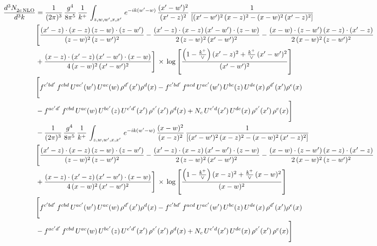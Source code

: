 \documentclass[10pt]{article}
\numberwithin{equation}{section}
\begin{document}
\begin{align}
    \frac{d^{3}N_{2c\,\rm NLO}^{\rm}}{d^{3}k}  & =  \frac{1}{(2\pi)^{3}}\, \frac{g^{4}}{8\pi^{5}}\,\frac{1}{k^{+}}\,\int_{z,w,w^{\prime},x,x'}\, e^{-ik(w^{\prime}-w)}\,\frac{(x'-w')^{2}}{(x'-z)^{2}}\, \frac{1}{\left[(x'-w')^{2}\, (x-z)^{2} - (x-w)^{2}\, (x'-z)^{2}\right]} \notag \\ & \Bigg[\frac{(x'-z)\cdot (x-z)\, (z-w)\cdot (z-w')}{(z-w)^{2}\, (z-w')^{2}}-\frac{(x'-z)\cdot (x-z)\, (x'-w')\cdot (z-w)}{2\, (z-w)^{2}\, (x'-w')^{2}} -\frac{(x-w)\cdot (z-w')\, (x-z)\cdot (x'-z)}{2\, (x-w)^{2}\, (z-w')^{2}}\notag \\ & +\frac{(x-z)\cdot (x'-z)\, (x'-w')\cdot (x-w)}{4\, (x-w)^{2}\, (x'-w')^{2}}\Bigg]\,\times\, \log{\left[\frac{\left(1-\frac{k^{+}}{\vee}\right)(x'-z)^{2}+\frac{k^{+}}{\vee}\,(x'-w')^{2}}{(x'-w')^{2}}\right]} \notag \\ &  \Bigg[f^{c'bd'}\,f^{cbd}\, U^{ac'}(w')\,U^{ac}(w)\,\rho^{d'}(x')\rho^{d}(x)- f^{c'bd'}\,f^{acd}\,U^{ac'}(w')\,U^{bc}(z)\,U^{de}(x)\,\rho^{d'}(x')\rho^{e}(x) \notag \\ & -f^{ac'd'}\,f^{cbd}\,U^{ac}(w)\,U^{bc'}(z)\,U^{e'd'}(x')\,\rho^{e'}(x')\,\rho^{d}(x) +N_{c}\,U^{e'd}(x')\,U^{de}(x)\,\rho^{e'}(x')\,\rho^{e}(x)\Bigg] \notag \\
& -\frac{1}{(2\pi)^{3}}\, \frac{g^{4}}{8\pi^{5}}\,\frac{1}{k^{+}}\,\int_{z,w,w^{\prime},x,x'}\, e^{-ik(w^{\prime}-w)}\,\frac{(x-w)^{2}}{(x-z)^{2}}\, \frac{1}{\left[(x'-w')^{2}\, (x-z)^{2} - (x-w)^{2}\, (x'-z)^{2}\right]} \notag \\ & \Bigg[\frac{(x'-z)\cdot (x-z)\, (z-w)\cdot (z-w')}{(z-w)^{2}\, (z-w')^{2}}-\frac{(x'-z)\cdot (x-z)\, (x'-w')\cdot (z-w)}{2\, (z-w)^{2}\, (x'-w')^{2}} -\frac{(x-w)\cdot (z-w')\, (x-z)\cdot (x'-z)}{2\, (x-w)^{2}\, (z-w')^{2}}\notag \\ & +\frac{(x-z)\cdot (x'-z)\, (x'-w')\cdot (x-w)}{4\, (x-w)^{2}\, (x'-w')^{2}}\Bigg]\,\times\, \log{\left[\frac{\left(1-\frac{k^{+}}{\vee}\right)(x-z)^{2}+\frac{k^{+}}{\vee}\,(x-w)^{2}}{(x-w)^{2}}\right]} \notag \\ &  \Bigg[f^{c'bd'}\,f^{cbd}\, U^{ac'}(w')\,U^{ac}(w)\,\rho^{d'}(x')\rho^{d}(x)- f^{c'bd'}\,f^{acd}\,U^{ac'}(w')\,U^{bc}(z)\,U^{de}(x)\,\rho^{d'}(x')\rho^{e}(x) \notag \\ & -f^{ac'd'}\,f^{cbd}\,U^{ac}(w)\,U^{bc'}(z)\,U^{e'd'}(x')\,\rho^{e'}(x')\,\rho^{d}(x) +N_{c}\,U^{e'd}(x')\,U^{de}(x)\,\rho^{e'}(x')\,\rho^{e}(x)\Bigg]
\end{align}
\end{document}
